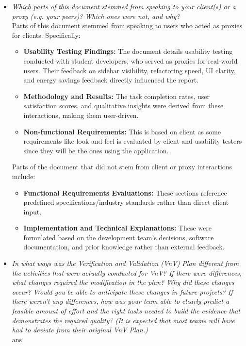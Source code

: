 \documentclass[12pt, titlepage]{article}
\begin{document}
\begin{itemize}
  \item \textit{Which parts of this document stemmed from speaking to your client(s) or
  a proxy (e.g. your peers)? Which ones were not, and why?} \\ 
  
  Parts of this document stemmed from speaking to users who acted as proxies for clients. Specifically:
  \begin{itemize}
      \item \textbf{Usability Testing Findings:} The document details usability testing conducted with student developers, who served as proxies for real-world users. Their feedback on sidebar visibility, refactoring speed, UI clarity, and energy savings feedback directly influenced the report.
      \item \textbf{Methodology and Results:} The task completion rates, user satisfaction scores, and qualitative insights were derived from these interactions, making them user-driven.
      \item \textbf{Non-functional Requirements:} This is based on client as some requirements like look and feel is evaluated by client and usability testers since they will be the ones using the application.
  \end{itemize}

  Parts of the document that did not stem from client or proxy interactions include:
  \begin{itemize}

  \item \textbf{Functional Requirements Evaluations:} These sections reference predefined specifications/industry standards rather than direct client input.
  \item \textbf{Implementation and Technical Explanations:} These were formulated based on the development team’s decisions, software documentation, and prior knowledge rather than external feedback.

  \end{itemize}
  

  \item \textit{In what ways was the Verification and Validation (VnV) Plan different
  from the activities that were actually conducted for VnV?  If there were
  differences, what changes required the modification in the plan?  Why did
  these changes occur?  Would you be able to anticipate these changes in future
  projects?  If there weren't any differences, how was your team able to clearly
  predict a feasible amount of effort and the right tasks needed to build the
  evidence that demonstrates the required quality?  (It is expected that most
  teams will have had to deviate from their original VnV Plan.)}\\ 
  
  ans
\end{itemize}
\end{document}

